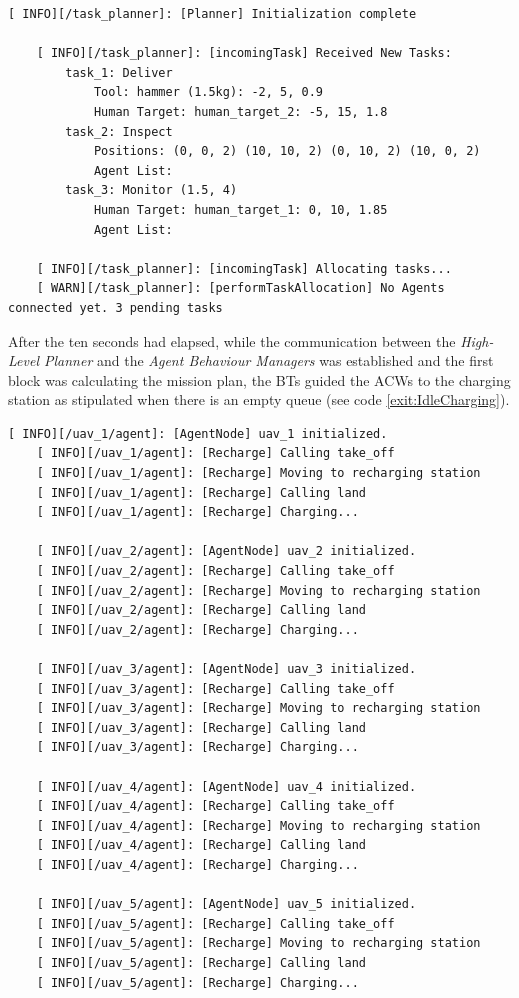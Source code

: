\begin{lstlisting}[caption={Feedback messages printed after the start of the simulation before the ACWs were connected}, breaklines=true, label=exit:NoAgentsCoonectedYet]
    [ INFO][/task_planner]: [Planner] Initialization complete

    [ INFO][/task_planner]: [incomingTask] Received New Tasks:
	    task_1: Deliver
		    Tool: hammer (1.5kg): -2, 5, 0.9
		    Human Target: human_target_2: -5, 15, 1.8
	    task_2: Inspect
		    Positions: (0, 0, 2) (10, 10, 2) (0, 10, 2) (10, 0, 2)
		    Agent List:
	    task_3: Monitor (1.5, 4)
		    Human Target: human_target_1: 0, 10, 1.85
		    Agent List:

    [ INFO][/task_planner]: [incomingTask] Allocating tasks...
    [ WARN][/task_planner]: [performTaskAllocation] No Agents connected yet. 3 pending tasks
\end{lstlisting}

After the ten seconds had elapsed, while the communication between the \emph{High-Level Planner} and the \emph{Agent Behaviour Managers} was established and the first block was calculating the mission plan, the \glspl{BT} guided the \glspl{ACW} to the charging station as stipulated when there is an empty queue (see code \ref{exit:IdleCharging}).

\begin{lstlisting}[caption={Feedback messages printed before the \glspl{ACW} received their new queues}, breaklines=true, label=exit:IdleCharging]
    [ INFO][/uav_1/agent]: [AgentNode] uav_1 initialized.
    [ INFO][/uav_1/agent]: [Recharge] Calling take_off
    [ INFO][/uav_1/agent]: [Recharge] Moving to recharging station
    [ INFO][/uav_1/agent]: [Recharge] Calling land
    [ INFO][/uav_1/agent]: [Recharge] Charging...
    
    [ INFO][/uav_2/agent]: [AgentNode] uav_2 initialized.
    [ INFO][/uav_2/agent]: [Recharge] Calling take_off
    [ INFO][/uav_2/agent]: [Recharge] Moving to recharging station
    [ INFO][/uav_2/agent]: [Recharge] Calling land
    [ INFO][/uav_2/agent]: [Recharge] Charging...
    
    [ INFO][/uav_3/agent]: [AgentNode] uav_3 initialized.
    [ INFO][/uav_3/agent]: [Recharge] Calling take_off
    [ INFO][/uav_3/agent]: [Recharge] Moving to recharging station
    [ INFO][/uav_3/agent]: [Recharge] Calling land
    [ INFO][/uav_3/agent]: [Recharge] Charging...
    
    [ INFO][/uav_4/agent]: [AgentNode] uav_4 initialized.
    [ INFO][/uav_4/agent]: [Recharge] Calling take_off
    [ INFO][/uav_4/agent]: [Recharge] Moving to recharging station
    [ INFO][/uav_4/agent]: [Recharge] Calling land
    [ INFO][/uav_4/agent]: [Recharge] Charging...

    [ INFO][/uav_5/agent]: [AgentNode] uav_5 initialized.
    [ INFO][/uav_5/agent]: [Recharge] Calling take_off
    [ INFO][/uav_5/agent]: [Recharge] Moving to recharging station
    [ INFO][/uav_5/agent]: [Recharge] Calling land
    [ INFO][/uav_5/agent]: [Recharge] Charging...
\end{lstlisting}

